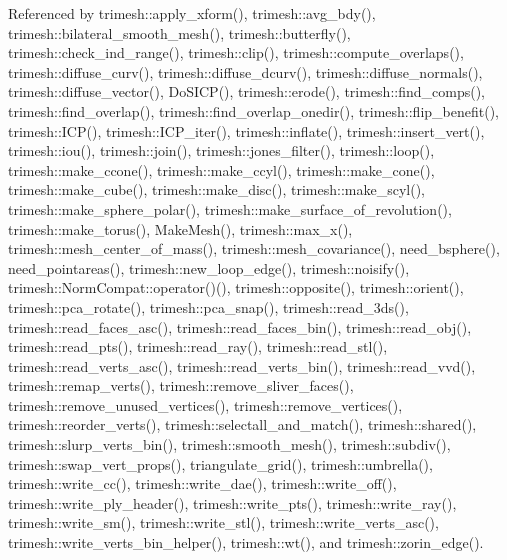 Referenced by trimesh\+::apply\+\_\+xform(), trimesh\+::avg\+\_\+bdy(), trimesh\+::bilateral\+\_\+smooth\+\_\+mesh(), trimesh\+::butterfly(), trimesh\+::check\+\_\+ind\+\_\+range(), trimesh\+::clip(), trimesh\+::compute\+\_\+overlaps(), trimesh\+::diffuse\+\_\+curv(), trimesh\+::diffuse\+\_\+dcurv(), trimesh\+::diffuse\+\_\+normals(), trimesh\+::diffuse\+\_\+vector(), Do\+S\+I\+C\+P(), trimesh\+::erode(), trimesh\+::find\+\_\+comps(), trimesh\+::find\+\_\+overlap(), trimesh\+::find\+\_\+overlap\+\_\+onedir(), trimesh\+::flip\+\_\+benefit(), trimesh\+::\+I\+C\+P(), trimesh\+::\+I\+C\+P\+\_\+iter(), trimesh\+::inflate(), trimesh\+::insert\+\_\+vert(), trimesh\+::iou(), trimesh\+::join(), trimesh\+::jones\+\_\+filter(), trimesh\+::loop(), trimesh\+::make\+\_\+ccone(), trimesh\+::make\+\_\+ccyl(), trimesh\+::make\+\_\+cone(), trimesh\+::make\+\_\+cube(), trimesh\+::make\+\_\+disc(), trimesh\+::make\+\_\+scyl(), trimesh\+::make\+\_\+sphere\+\_\+polar(), trimesh\+::make\+\_\+surface\+\_\+of\+\_\+revolution(), trimesh\+::make\+\_\+torus(), Make\+Mesh(), trimesh\+::max\+\_\+x(), trimesh\+::mesh\+\_\+center\+\_\+of\+\_\+mass(), trimesh\+::mesh\+\_\+covariance(), need\+\_\+bsphere(), need\+\_\+pointareas(), trimesh\+::new\+\_\+loop\+\_\+edge(), trimesh\+::noisify(), trimesh\+::\+Norm\+Compat\+::operator()(), trimesh\+::opposite(), trimesh\+::orient(), trimesh\+::pca\+\_\+rotate(), trimesh\+::pca\+\_\+snap(), trimesh\+::read\+\_\+3ds(), trimesh\+::read\+\_\+faces\+\_\+asc(), trimesh\+::read\+\_\+faces\+\_\+bin(), trimesh\+::read\+\_\+obj(), trimesh\+::read\+\_\+pts(), trimesh\+::read\+\_\+ray(), trimesh\+::read\+\_\+stl(), trimesh\+::read\+\_\+verts\+\_\+asc(), trimesh\+::read\+\_\+verts\+\_\+bin(), trimesh\+::read\+\_\+vvd(), trimesh\+::remap\+\_\+verts(), trimesh\+::remove\+\_\+sliver\+\_\+faces(), trimesh\+::remove\+\_\+unused\+\_\+vertices(), trimesh\+::remove\+\_\+vertices(), trimesh\+::reorder\+\_\+verts(), trimesh\+::selectall\+\_\+and\+\_\+match(), trimesh\+::shared(), trimesh\+::slurp\+\_\+verts\+\_\+bin(), trimesh\+::smooth\+\_\+mesh(), trimesh\+::subdiv(), trimesh\+::swap\+\_\+vert\+\_\+props(), triangulate\+\_\+grid(), trimesh\+::umbrella(), trimesh\+::write\+\_\+cc(), trimesh\+::write\+\_\+dae(), trimesh\+::write\+\_\+off(), trimesh\+::write\+\_\+ply\+\_\+header(), trimesh\+::write\+\_\+pts(), trimesh\+::write\+\_\+ray(), trimesh\+::write\+\_\+sm(), trimesh\+::write\+\_\+stl(), trimesh\+::write\+\_\+verts\+\_\+asc(), trimesh\+::write\+\_\+verts\+\_\+bin\+\_\+helper(), trimesh\+::wt(), and trimesh\+::zorin\+\_\+edge().



